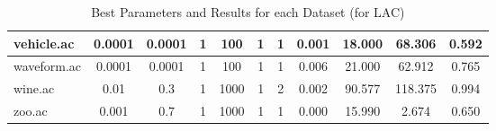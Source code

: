 \begin{table}[htbp]
\begin{tabular}{|l|c|c|c|c|c|c|c|c|c|c|}
		\hline
		vehicle.ac     & 0.0001   & 0.0001      & 1              & 100                 & 1             & 1             & 0.001          & 18.000         & 68.306         & 0.592          \\
		\hline
		waveform.ac    & 0.0001   & 0.0001      & 1              & 100                 & 1             & 1             & 0.006          & 21.000         & 62.912         & 0.765          \\
		\hline
		wine.ac        & 0.01     & 0.3         & 1              & 1000                & 1             & 2             & 0.002          & 90.577         & 118.375        & 0.994          \\
		\hline
		zoo.ac         & 0.001    & 0.7         & 1              & 1000                & 1             & 1             & 0.000          & 15.990         & 2.674          & 0.650          \\
		\hline
		\end{tabular}
	\caption{Best Parameters and Results for each Dataset (for LAC)}
	\label{tab:best_runs_for_each_db_lac}
\end{table}